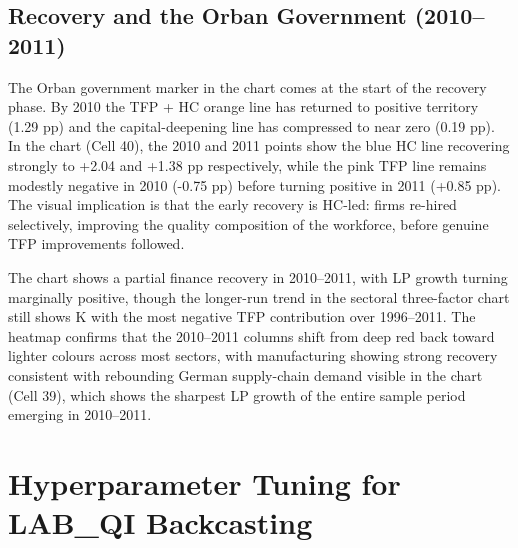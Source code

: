 \documentclass[11pt]{article}
\begin{document}
\subsection{Recovery and the Orban Government (2010–2011)}

The Orban government marker in the chart comes at the start of the recovery phase. By 2010 the TFP + HC orange line has returned to positive territory (1.29 pp) and the capital-deepening line has compressed to near zero (0.19 pp). In the chart (Cell 40), the 2010 and 2011 points show the blue HC line recovering strongly to +2.04 and +1.38 pp respectively, while the pink TFP line remains modestly negative in 2010 (-0.75 pp) before turning positive in 2011 (+0.85 pp). The visual implication is that the early recovery is HC-led: firms re-hired selectively, improving the quality composition of the workforce, before genuine TFP improvements followed.

The chart shows a partial finance recovery in 2010–2011, with LP growth turning marginally positive, though the longer-run trend in the sectoral three-factor chart still shows K with the most negative TFP contribution over 1996–2011. The heatmap confirms that the 2010–2011 columns shift from deep red back toward lighter colours across most sectors, with manufacturing showing strong recovery consistent with rebounding German supply-chain demand visible in the chart (Cell 39), which shows the sharpest LP growth of the entire sample period emerging in 2010–2011.

\appendix
\section{Hyperparameter Tuning for LAB\_QI Backcasting}
\begin{center}

\end{center}
\end{document}
